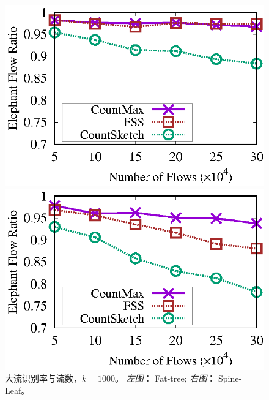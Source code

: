 \begin{figure}[!t]
	\centering
	\begin{minipage}[t]{0.49\linewidth}
		\centering
		\includegraphics[width=\linewidth]{fig/ft_flow_hit_1000.eps}
	\end{minipage}\vspace{-0.6em}%
	\begin{minipage}[t]{0.49\linewidth}
		\centering
		\includegraphics[width=\linewidth]{fig/hy_flow_hit_1000.eps}
	\end{minipage} \vspace{-0.6em}%
	\caption{\textnormal{大流识别率与流数，$k=1000$。 \textit{左图}： Fat-tree; \textit{右图}： Spine-Leaf。}}
	\label{fig:hit,f,1000}
\end{figure}

